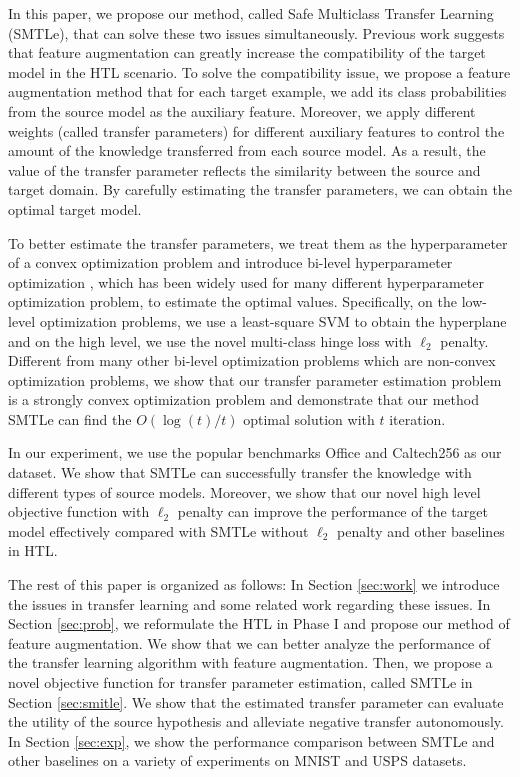 In this paper, we propose our method, {called Safe Multiclass Transfer Learning (SMTLe)}, that can solve these two issues simultaneously. Previous work \cite{jie2011multiclass} suggests that feature augmentation can greatly increase the compatibility of the target model in the HTL scenario. To solve the compatibility issue, we propose a feature augmentation method that for each target example, we add its class probabilities from the source model as the auxiliary feature. Moreover, we apply different weights (called transfer parameters) for different auxiliary features to control the amount of the knowledge transferred from each source model. As a result, the value of the transfer parameter reflects the similarity between the source and target domain. By carefully estimating the transfer parameters, we can obtain the optimal target model.

To better estimate the transfer parameters, we treat them as the hyperparameter of a convex optimization problem and  
introduce bi-level hyperparameter optimization\cite{Pedregosa16} , which has been widely used for many different hyperparameter optimization problem, to estimate the optimal values. Specifically, on the low-level optimization problems, we use a least-square SVM to obtain the hyperplane and on the high level, we use the novel multi-class hinge loss with $\ell_2$ penalty. Different from many other bi-level optimization problems which are non-convex optimization problems, we show that our transfer parameter estimation problem is a strongly convex optimization problem and demonstrate that our method SMTLe can find the $O({\log(t)}/{t})$ optimal solution with $t$ iteration. 

In our experiment, we use the popular benchmarks Office and Caltech256 as our dataset. We show that SMTLe can successfully transfer the knowledge with different types of source models. Moreover, we show that our novel high level objective function with $\ell_2$ penalty can improve the performance of the target model effectively compared with SMTLe without $\ell_2$ penalty and other baselines in HTL. 

The rest of this paper is organized as follows: In Section \ref{sec:work} we introduce the issues in transfer learning and some related work regarding these issues.
In Section \ref{sec:prob}, we reformulate the HTL in Phase I and propose our method of feature augmentation. We show that we can better analyze the performance of the transfer learning algorithm with feature augmentation. Then, we propose a novel objective function for transfer parameter estimation, called SMTLe in Section \ref{sec:smitle}. We show that the estimated transfer parameter can evaluate the utility of the source hypothesis and alleviate negative transfer autonomously. In Section \ref{sec:exp}, we show the performance comparison between SMTLe and other baselines on a variety of experiments on MNIST and USPS datasets.
